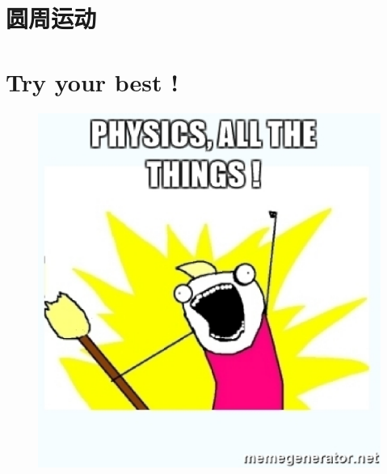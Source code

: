 \documentclass[a4paper,oneside,11pt]{article}
\begin{document}
\section{圆周运动}
\section{Try your best !}
\begin{figure}[!h]
\centering
\includegraphics[scale=0.6]{./figure/fig0.eps}
\end{figure}
\end{document}
